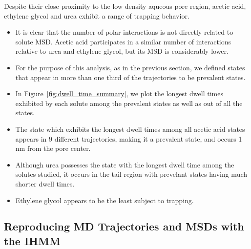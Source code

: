 \documentclass{article}
\begin{document}
  Despite their close proximity to the low density aqueous pore region, acetic
  acid, ethylene glycol and urea exhibit a range of trapping behavior.
  \begin{itemize}
    \item It is clear that the number of polar interactions is not directly
    related to solute MSD. Acetic acid participates in a similar number of 
    interactions relative to urea and ethylene glycol, but its MSD is considerably
    lower.
    \item For the purpose of this analysis, as in the previous section, we 
    defined states that appear in more than one third of the trajectories to
    be prevalent states.
    \item In Figure~\ref{fig:dwell_time_summary}, we plot the longest dwell
    times exhibited by each solute among the prevalent states as well 
    as out of all the states.
    \item The state which exhibits the longest dwell times among all acetic
    acid states appears in 9 different trajectories, making it a prevalent state,
    and occurs 1 nm from the pore center. %
    \item Although urea possesses the state with the longest dwell time among the
    solutes studied, it occurs in the tail region with prevelant states having 
    much shorter dwell times.  %
    \item Ethylene glycol appears to be the least subject to trapping.
  \end{itemize}


  \subsection{Reproducing MD Trajectories and MSDs with the IHMM}
  
  
\end{document}
